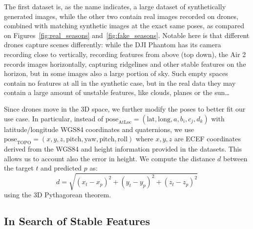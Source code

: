 \documentclass[10pt,conference,compsocconf]{IEEEtran}
\begin{document}
The first dataset is, as the name indicates, a large dataset of synthetically generated images, while the other two contain real images recorded on drones, combined with matching synthetic images at the exact same poses, as compared on Figures~\ref{fig:real_seasons} and~\ref{fig:fake_seasons}. Notable here is that different drones capture scenes differently: while the DJI Phantom has its camera recording close to vertically, recording features from above (top down), the Air 2 records images horizontally, capturing ridgelines and other stable features on the horizon, but in some images also a large portion of sky. Such empty spaces contain no features at all in the synthetic case, but in the real data they may contain a large amount of unstable features, like clouds, planes or the sun\ldots

Since drones move in the 3D space, we further modify the poses to better fit our use case. In particular, instead of $\text{pose}_{\text{AtLoc}} = (\text{lat},\text{long},a,b_i,c_j,d_k)$ with latitude/longitude WGS84 coordinates and quaternions, we use $\text{pose}_{\text{TOPO}} = (x,y,z,\text{pitch},\text{yaw},\text{pitch},\text{roll})$ where $x,y,z$ are ECEF coordinates derived from the WGS84 and height information provided in the datasets. This allows us to account also the error in height. We compute the distance $d$ between the target $t$ and predicted $p$ as:
$$d = \sqrt{(x_{t}-x_{p})^2 + (y_{t}-y_{p})^2 + (z_{t}-z_{p})^2}$$
using the 3D Pythagorean theorem.

\subsection{In Search of Stable Features}
\end{document}
